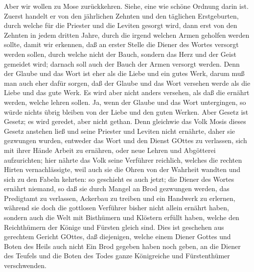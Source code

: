 Aber wir wollen zu Mose zurückkehren. Siehe, eine wie schöne Ordnung darin ist. Zuerst handelt er von den jährlichen Zehnten und den täglichen Erstgeburten, durch welche für die Priester und die Leviten gesorgt wird, dann erst von den Zehnten in jedem dritten Jahre, durch die irgend welchen Armen geholfen werden sollte, damit wir erkennen, daß an erster Stelle die Diener des Wortes versorgt werden sollen, durch welche nicht der Bauch, sondern das Herz und der Geist
gemeidet wird; darnach soll auch der Bauch der Armen versorgt werden. Denn der Glaube und das Wort ist eher als die Liebe und ein gutes Werk, darum muß man auch eher dafür sorgen, daß der Glaube und das Wort versehen werde als die Liebe und das gute Werk. Es wird aber nicht anders versehen, als daß die ernährt werden, welche lehren sollen. Ja, wenn der Glaube und das Wort untergingen, so würde nichts übrig bleiben von der Liebe und den guten Werken. Aber Gesetz ist Gesetz; es wird geredet, aber nicht gethan. Denn gleichwie das Volk Mosis dieses Gesetz anstehen ließ und seine Priester und Leviten nicht ernährte, daher sie gezwungen wurden, entweder das Wort und den Dienst GOttes zu verlassen, sich mit ihrer Hände Arbeit zu ernähren, oder neue Lehren und Abgötterei aufzurichten; hier nährte das Volk seine Verführer reichlich, welches die rechten Hirten vernachlässigte, weil auch sie die Ohren von der Wahrheit wandten und sich zu den Fabeln kehrten: so geschieht es auch jetzt; die Diener des Wortes ernährt niemand, so daß sie durch Mangel an Brod gezwungen werden, das Predigtamt zu verlassen, Ackerbau zu treiben und ein Handwerk zu erlernen, während sie doch die gottlosen Verführer bisher nicht allein ernährt haben, sondern auch die Welt mit Bisthümern und Klöstern erfüllt haben, welche den Reichthümern der Könige und Fürsten gleich sind. Dies ist geschehen aus gerechtem Gericht GOttes, daß diejenigen, welche einem Diener Gottes und Boten des Heils auch nicht Ein Brod gegeben haben noch geben, an die Diener des Teufels und die Boten des Todes ganze Königreiche und Fürstenthümer verschwenden.

